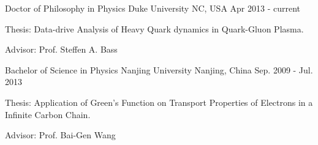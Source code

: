 

\begin{cventries}

  \cventry
    {Doctor of Philosophy in Physics} %
    {Duke University} %
    {NC, USA} %
    {Apr 2013 - current} %
    {
      \begin{cvitems} %
         \item {Thesis: Data-drive Analysis of Heavy Quark dynamics in Quark-Gluon Plasma.}
         \item { Advisor: Prof. Steffen A. Bass}
      \end{cvitems}
    }
    
    \cventry
      {Bachelor of Science in Physics} %
      {Nanjing University} %
      {Nanjing, China} %
      {Sep. 2009 - Jul. 2013} %
      {
        \begin{cvitems} %
           \item {Thesis: Application of Green's Function on Transport Properties of Electrons in a Infinite Carbon Chain.}
           \item {Advisor: Prof. Bai-Gen Wang}
        \end{cvitems}
      }

\end{cventries}
